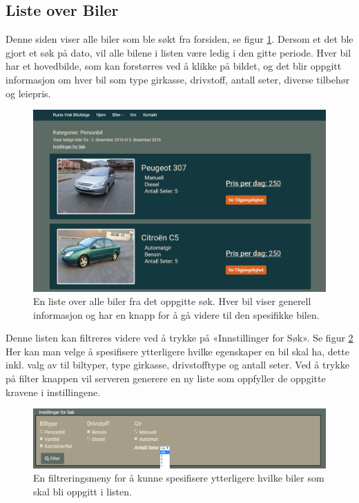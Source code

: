 \subsection{Liste over Biler}
Denne siden viser alle biler som ble søkt fra forsiden, se figur \ref{fig:rv_carlist}. Dersom et det ble gjort et søk på dato, vil alle bilene i listen være ledig i den gitte periode. Hver bil har et hovedbilde, som kan forstørres ved å klikke på bildet, og det blir oppgitt informasjon om hver bil som type girkasse, drivstoff, antall seter, diverse tilbehør og leiepris. 

 \begin{figure}[htbp]
	\centering
		\includegraphics[scale=0.4]{Bilder/rv_carlist.png}
	\caption[Liste over Biler]{En liste over alle biler fra det oppgitte søk. Hver bil viser generell informasjon og har en knapp for å gå videre til den spesifikke bilen. } %
	\label{fig:rv_carlist}
\end{figure}

Denne listen kan filtreres videre ved å trykke på «Innstillinger for Søk». Se figur \ref{fig:rv_carlist_filter} Her kan man velge å spesifisere ytterligere hvilke egenskaper en bil skal ha, dette inkl. valg av til biltyper, type girkasse, drivstofftype og antall seter. Ved å trykke på filter knappen vil serveren generere en ny liste som oppfyller de oppgitte kravene i instillingene.

 \begin{figure}[htbp]
	\centering
		\includegraphics[scale=0.5]{Bilder/rv_carlist_filter.png}
	\caption[Instillinger for Søk]{En filtreringsmeny for å kunne spesifisere ytterligere hvilke biler som skal bli oppgitt i listen.} %
	\label{fig:rv_carlist_filter}
\end{figure}




